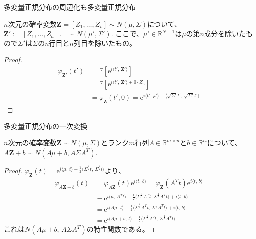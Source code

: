 \documentclass[lualatex,handout]{beamer}
\newcommand{\expt}[1]{\mathbb{E}\left[#1\right]}
\theoremstyle{definition}
\begin{document}
\begin{frame}{多変量正規分布の周辺化も多変量正規分布}
\begin{lemma}
$n$次元の確率変数$\symbf{Z}=[Z_1,\dotsc, Z_n]\sim N(\mu, \Sigma)$について、
$\symbf{Z}':=[Z_1,\dotsc, Z_{n-1}]\sim N(\mu', \Sigma')$.
ここで、$\mu'\in\mathbb{R}^{N-1}$は$\mu$の第$n$成分を除いたもので$\Sigma'$は$\Sigma$の$n$行目と$n$列目を除いたもの。
\end{lemma}
\begin{proof}
\begin{align*}
\varphi_{\symbf{Z}'}(t') &= \expt{\mathrm{e}^{i\langle t',\,\symbf{Z}'\rangle}}\\
&=\expt{\mathrm{e}^{i\langle t',\, \symbf{Z}'\rangle + 0\cdot Z_n}}\\
&=\varphi_{\symbf{Z}}(t',0) = \mathrm{e}^{i\langle t',\,\mu'\rangle - \langle \sqrt{\Sigma'}t',\,\sqrt{\Sigma'}t'\rangle}
\end{align*}
\end{proof}
\end{frame}

\begin{frame}{多変量正規分布の一次変換}
\begin{lemma}
$n$次元の確率変数$\symbf{Z}\sim N(\mu, \Sigma)$とランク$m$行列$A\in\mathbb{R}^{m\times n}$と$b\in\mathbb{R}^m$について、
$A\symbf{Z}+b\sim N(A\mu+b, A\Sigma A^T)$.
\end{lemma}
\begin{proof}
$\varphi_{\symbf{Z}}(t) = \mathrm{e}^{i\langle \mu,\, t\rangle - \frac12\langle \Sigma^\frac12t,\,\Sigma^\frac12t\rangle}$より、
\begin{align*}
\varphi_{A{\symbf{Z}}+b}(t) &= \varphi_{A{\symbf{Z}}}(t)\mathrm{e}^{i\langle t,\,b\rangle} = \varphi_{\symbf{Z}}(A^Tt)\mathrm{e}^{i\langle t,\,b\rangle}\\
&= \mathrm{e}^{i\langle \mu,\, A^T t\rangle - \frac12\langle \Sigma^\frac12A^T t,\,\Sigma^\frac12A^T t\rangle + i\langle t,\,b\rangle}\\
&= \mathrm{e}^{i\langle A\mu,\, t\rangle - \frac12\langle \Sigma^\frac12A^T t,\,\Sigma^\frac12A^T t\rangle+ i\langle t,\,b\rangle}\\
&= \mathrm{e}^{i\langle A\mu + b,\, t\rangle - \frac12\langle \Sigma^\frac12A^T t,\,\Sigma^\frac12A^T t\rangle}
\end{align*}
これは$N(A\mu+b,\, A\Sigma A^T)$の特性関数である。
\end{proof}
\end{frame}
\end{document}
